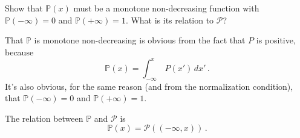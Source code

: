 

Show that $\mathbb{P}(x)$ must be a monotone non-decreasing function with $\mathbb{P}(-\infty) = 0$ and $\mathbb{P}(+\infty) = 1$.
What is its relation to $\mathcal{P}$?


That $\mathbb{P}$ is monotone non-decreasing is obvious from the fact that $P$ is positive, because
\begin{equation*}
  \mathbb{P}(x) = \int_{-\infty}^x \, P(x') \, dx'
  \, .
\end{equation*}
It's also obvious, for the same reason (and from the normalization condition), that $\mathbb{P}(-\infty)=0$ and $\mathbb{P}(+\infty) = 1$.

The relation between $\mathbb{P}$ and $\mathcal{P}$ is
\begin{equation*}
  \mathbb{P}(x) = \mathcal{P}((-\infty, x))
  \, .
\end{equation*}
